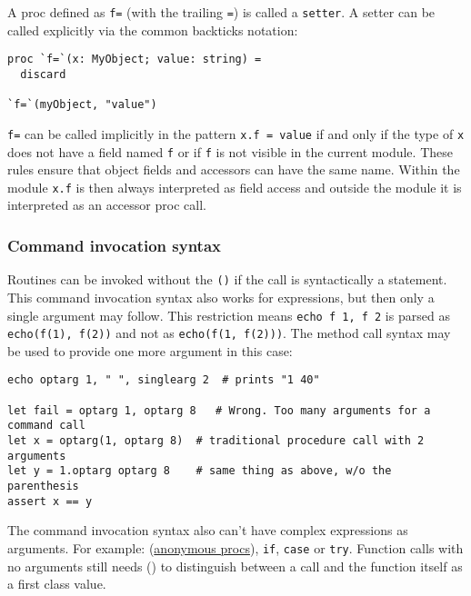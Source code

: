 \begin{verbatim}
\end{verbatim}

A proc defined as \texttt{f=} (with the trailing \texttt{=}) is called a
\texttt{setter}. A setter can be called explicitly via the common
backticks notation:

\begin{verbatim}
proc `f=`(x: MyObject; value: string) =
  discard

`f=`(myObject, "value")
\end{verbatim}

\texttt{f=} can be called implicitly in the pattern
\texttt{x.f\ =\ value} if and only if the type of \texttt{x} does not
have a field named \texttt{f} or if \texttt{f} is not visible in the
current module. These rules ensure that object fields and accessors can
have the same name. Within the module \texttt{x.f} is then always
interpreted as field access and outside the module it is interpreted as
an accessor proc call.

\hypertarget{command-invocation-syntax}{%
\subsubsection{Command invocation
syntax}\label{command-invocation-syntax}}

Routines can be invoked without the \texttt{()} if the call is
syntactically a statement. This command invocation syntax also works for
expressions, but then only a single argument may follow. This
restriction means \texttt{echo\ f\ 1,\ f\ 2} is parsed as
\texttt{echo(f(1),\ f(2))} and not as \texttt{echo(f(1,\ f(2)))}. The
method call syntax may be used to provide one more argument in this
case:

\begin{verbatim}
echo optarg 1, " ", singlearg 2  # prints "1 40"

let fail = optarg 1, optarg 8   # Wrong. Too many arguments for a command call
let x = optarg(1, optarg 8)  # traditional procedure call with 2 arguments
let y = 1.optarg optarg 8    # same thing as above, w/o the parenthesis
assert x == y
\end{verbatim}

The command invocation syntax also can't have complex expressions as
arguments. For example:
(\protect\hyperlink{procedures-anonymous-procs}{anonymous procs}),
\texttt{if}, \texttt{case} or \texttt{try}. Function calls with no
arguments still needs () to distinguish between a call and the function
itself as a first class value.

